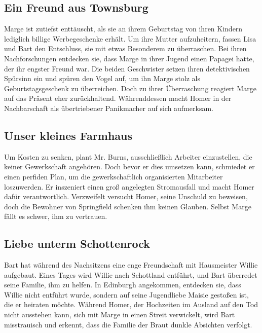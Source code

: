 \subsection{Ein Freund aus Townsburg}
Marge ist zutiefst enttäuscht, als sie an ihrem Geburtstag von ihren Kindern lediglich billige Werbegeschenke erhält. Um ihre Mutter aufzuheitern, fassen Lisa und Bart den Entschluss, sie mit etwas Besonderem zu überraschen. Bei ihren Nachforschungen entdecken sie, dass Marge in ihrer Jugend einen Papagei hatte, der ihr engster Freund war. Die beiden Geschwister setzen ihren detektivischen Spürsinn ein und spüren den Vogel auf, um ihn Marge stolz als Geburtstagsgeschenk zu überreichen. Doch zu ihrer Überraschung reagiert Marge auf das Präsent eher zurückhaltend. Währenddessen macht Homer in der Nachbarschaft als übertriebener Panikmacher auf sich aufmerksam.


\subsection{Unser kleines Farmhaus}
Um Kosten zu senken, plant Mr. Burns, ausschließlich Arbeiter einzustellen, die keiner Gewerkschaft angehören. Doch bevor er dies umsetzen kann, schmiedet er einen perfiden Plan, um die gewerkschaftlich organisierten Mitarbeiter loszuwerden. Er inszeniert einen groß angelegten Stromausfall und macht Homer dafür verantwortlich. Verzweifelt versucht Homer, seine Unschuld zu beweisen, doch die Bewohner von Springfield schenken ihm keinen Glauben. Selbst Marge fällt es schwer, ihm zu vertrauen.


\subsection{Liebe unterm Schottenrock}
Bart hat während des Nachsitzens eine enge Freundschaft mit Hausmeister Willie aufgebaut. Eines Tages wird Willie nach Schottland entführt, und Bart überredet seine Familie, ihm zu helfen. In Edinburgh angekommen, entdecken sie, dass Willie nicht entführt wurde, sondern auf seine Jugendliebe Maisie gestoßen ist, die er heiraten möchte. Während Homer, der Hochzeiten im Ausland auf den Tod nicht ausstehen kann, sich mit Marge in einen Streit verwickelt, wird Bart misstrauisch und erkennt, dass die Familie der Braut dunkle Absichten verfolgt.

